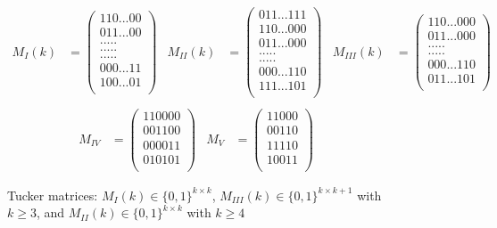 \documentclass[a4paper,10pt]{report}
\theoremstyle{plain}
\theoremstyle{remark}
\theoremstyle{plain}
\begin{document}
\begin{figure}[h!]
	\centering
	\begin{align*}
			M_I(k)&= \begin{pmatrix}
				110...00\\
				011...00\\
				.   .   .   .   . \\
				.   .   .   .   . \\
				.   .   .   .   . \\
				000...11\\
				100...01\\
			\end{pmatrix}
			&
			M_{II}(k)&= \begin{pmatrix}
				011...111\\
				110...000\\
				011...000\\
				.   .   .   .   . \\
				.   .   .   .   . \\
				000...110\\
				111...101\\
			\end{pmatrix}
			&
			M_{III}(k)&= \begin{pmatrix}
				110...000\\
				011...000\\
				.   .   .   .   . \\
				.   .   .   .   . \\
				000...110\\
				011...101\\
			\end{pmatrix}
			\\
			\end{align*}
			\begin{align*}
			M_{IV}&= \begin{pmatrix}
				110000\\
				001100\\
				000011\\
				010101\\
			\end{pmatrix}
			&
			M_{V}&= \begin{pmatrix}
				11000\\
				00110\\
				11110\\
				10011\\
			\end{pmatrix}
	\end{align*}
	\caption{Tucker matrices: $M_{I}(k) \in \{0,1\}^{k \times k}$, $M_{III}(k) \in \{0,1\}^{k \times k+1}$ with $k \geq 3$,
 	and $M_{II}(k) \in \{0,1\}^{k \times k}$ with $k \geq 4$}
\end{figure} \label{fig:tucker_matrices}
\end{document}
